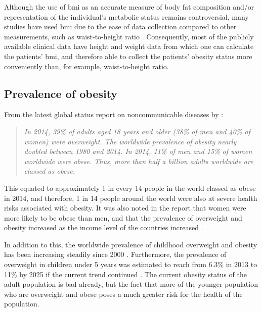 Although the use of \gls{bmi} as an accurate measure of body fat composition and/or representation of the individual's metabolic status remains controversial, many studies have used \gls{bmi} due to the ease of data collection compared to other measurements, such as waist-to-height ratio \citep{Lee2008, Gelber2008}.
Consequently, most of the publicly available clinical data have height and weight data from which one can calculate the patients' \gls{bmi}, and therefore able to collect the patients' obesity status more conveniently than, for example, waist-to-height ratio.

\subsection{Prevalence of obesity}
\label{sub:prevalence_of_obesity}

From the latest global status report on noncommunicable diseases by \citet{WHO2014}:
\begin{quote}
	\textit{
		In 2014, 39\% of adults aged 18 years and older (38\% of men and 40\% of women) were overweight.
		The worldwide prevalence of obesity nearly doubled between 1980 and 2014.
		In 2014, 11\% of men and 15\% of women worldwide were obese.
		Thus, more than half a billion adults worldwide are classed as obese.
	}
\end{quote}

\noindent
This equated to approximately 1 in every 14 people in the world classed as obese in 2014, and therefore, 1 in 14 people around the world were also at severe health risks associated with obesity.
It was also noted in the report that women were more likely to be obese than men, and that the prevalence of overweight and obesity increased as the income level of the countries increased \citep{WHO2014}.

In addition to this, the worldwide prevalence of childhood overweight and obesity has been increasing steadily since 2000 \citep{WHO2014}.
Furthermore, the prevalence of overweight in children under 5 years was estimated to reach from 6.3\% in 2013 to 11\% by 2025 if the current trend continued \citep{WHO2014}.
The current obesity status of the adult population is bad already, but the fact that more of the younger population who are overweight and obese poses a much greater risk for the health of the population.



